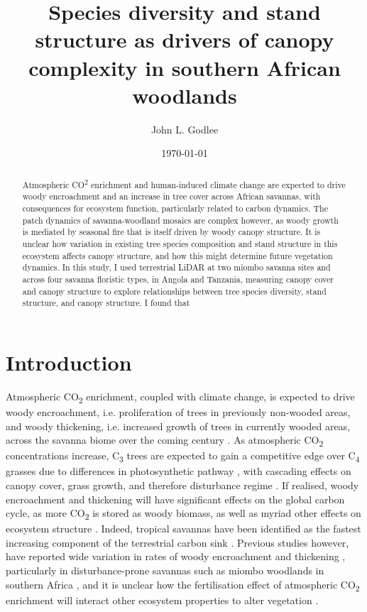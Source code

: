\documentclass[11pt,a4paper]{article}
\title{Species diversity and stand structure as drivers of canopy complexity in southern African woodlands}
\author{John L. Godlee}
\date{\today}
\begin{document}
\maketitle{}

\linenumbers

\begin{abstract}
Atmospheric CO\textsuperscript{2} enrichment and human-induced climate change are expected to drive woody encroachment and an increase in tree cover across African savannas, with consequences for ecosystem function, particularly related to carbon dynamics. The patch dynamics of savanna-woodland mosaics are complex however, as woody growth is mediated by seasonal fire that is itself driven by woody canopy structure. It is unclear how variation in existing tree species composition and stand structure in this ecosystem affects canopy structure, and how this might determine future vegetation dynamics. In this study, I used terrestrial LiDAR at two miombo savanna sites and across four savanna floristic types, in Angola and Tanzania, measuring canopy cover and canopy structure to explore relationships between tree species diversity, stand structure, and canopy structure. I found that 
\end{abstract}

\section{Introduction}

Atmospheric CO\textsubscript{2} enrichment, coupled with climate change, is expected to drive woody encroachment, i.e. proliferation of trees in previously non-wooded areas, and woody thickening, i.e. increased growth of trees in currently wooded areas, across the savanna biome over the coming century \citep{Criado2020, Stevens2016, Mitchard2013}. As atmospheric CO\textsubscript{2} concentrations increase, C\textsubscript{3} trees are expected to gain a competitive edge over C\textsubscript{4} grasses due to differences in photosynthetic pathway \citep{Buitenwerf2012}, with cascading effects on canopy cover, grass growth, and therefore disturbance regime \citep{Bond2012}. If realised, woody encroachment and thickening will have significant effects on the global carbon cycle, as more CO\textsubscript{2} is stored as woody biomass, as well as myriad other effects on ecosystem structure \citep{Donohue2013}. Indeed, tropical savannas have been identified as the fastest increasing component of the terrestrial carbon sink \citep{Sitch2015}. Previous studies however, have reported wide variation in rates of woody encroachment and thickening \citep{Mitchard2013}, particularly in disturbance-prone savannas such as miombo woodlands in southern Africa \citep{Lewis2009}, and it is unclear how the fertilisation effect of atmospheric CO\textsubscript{2} enrichment will interact other ecosystem properties to alter vegetation \citep{Korner2017, Reich2014}.
\end{document}
